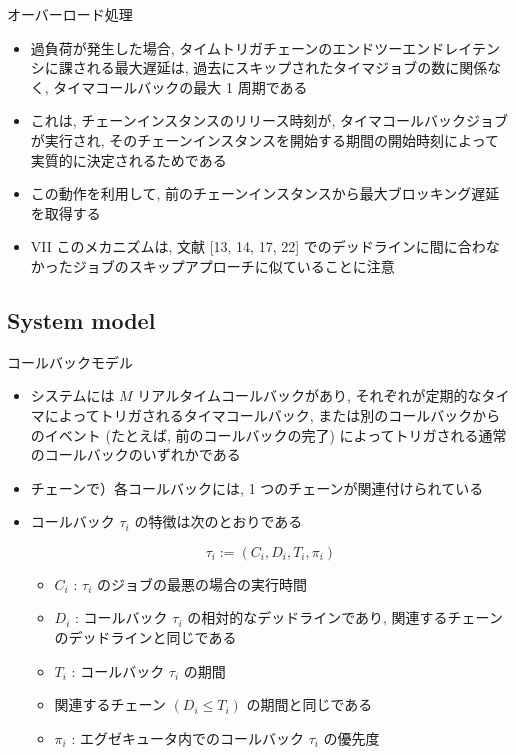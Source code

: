 \begin{frame}{オーバーロード処理}
    \begin{itemize}
        \item 過負荷が発生した場合, タイムトリガチェーンのエンドツーエンドレイテンシに課される最大遅延は, 過去にスキップされたタイマジョブの数に関係なく, タイマコールバックの最大 1 周期である
\item これは, チェーンインスタンスのリリース時刻が, タイマコールバックジョブが実行され, そのチェーンインスタンスを開始する期間の開始時刻によって実質的に決定されるためである
\item この動作を利用して, 前のチェーンインスタンスから最大ブロッキング遅延を取得する
\item VII このメカニズムは, 文献 [13, 14, 17, 22] でのデッドラインに間に合わなかったジョブのスキップアプローチに似ていることに注意
    \end{itemize}
\end{frame}


\subsection{System model}
\label{ssec: system model}

\begin{frame}{コールバックモデル}
    \begin{itemize}
        \item システムには $M$ リアルタイムコールバックがあり, それぞれが定期的なタイマによってトリガされるタイマコールバック, または別のコールバックからのイベント (たとえば, 前のコールバックの完了) によってトリガされる通常のコールバックのいずれかである
\item チェーンで）各コールバックには, 1 つのチェーンが関連付けられている
\item コールバック $\tau_{i}$ の特徴は次のとおりである

              \begin{equation*}
                  \tau_{i}:=\left(C_{i}, D_{i}, T_{i}, \pi_{i}\right)
              \end{equation*}

              \begin{itemize}
                  \item  $C_{i}$ : $\tau_{i}$ のジョブの最悪の場合の実行時間

                  \item  $D_{i}$ : コールバック $\tau_{i}$ の相対的なデッドラインであり, 関連するチェーンのデッドラインと同じである

                  \item  $T_{i}$ : コールバック $\tau_{i}$ の期間
\item 関連するチェーン $\left(D_{i} \leq T_{i}\right)$ の期間と同じである

                  \item  $\pi_{i}$ : エグゼキュータ内でのコールバック $\tau_{i}$ の優先度

              \end{itemize}

    \end{itemize}
\end{frame}

